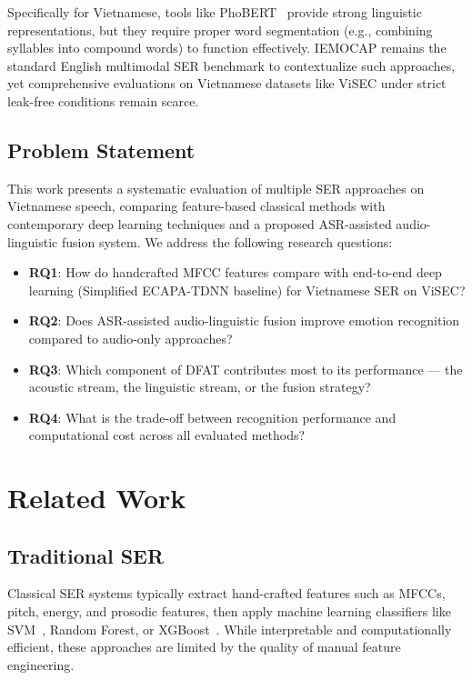 \documentclass[12pt,a4paper]{report}
\begin{document}
Specifically for Vietnamese, tools like PhoBERT~\cite{phobert} provide strong linguistic representations, but they require proper word segmentation (e.g., combining syllables into compound words) to function effectively. IEMOCAP remains the standard English multimodal SER benchmark to contextualize such approaches, yet comprehensive evaluations on Vietnamese datasets like ViSEC under strict leak-free conditions remain scarce.

\section{Problem Statement}
This work presents a systematic evaluation of multiple SER approaches on Vietnamese speech, comparing feature-based classical methods with contemporary deep learning techniques and a proposed ASR-assisted audio-linguistic fusion system. We address the following research questions:

\begin{itemize}
    \item \textbf{RQ1}: How do handcrafted MFCC features compare with end-to-end deep learning (Simplified ECAPA-TDNN baseline) for Vietnamese SER on ViSEC?
    \item \textbf{RQ2}: Does ASR-assisted audio-linguistic fusion improve emotion recognition compared to audio-only approaches?
    \item \textbf{RQ3}: Which component of DFAT contributes most to its performance --- the acoustic stream, the linguistic stream, or the fusion strategy?
    \item \textbf{RQ4}: What is the trade-off between recognition performance and computational cost across all evaluated methods?
\end{itemize}

\chapter{Related Work}

\section{Traditional SER}
Classical SER systems typically extract hand-crafted features such as MFCCs, pitch, energy, and prosodic features, then apply machine learning classifiers like SVM~\cite{ser_survey}, Random Forest, or XGBoost~\cite{xgboost}. While interpretable and computationally efficient, these approaches are limited by the quality of manual feature engineering.
\end{document}
